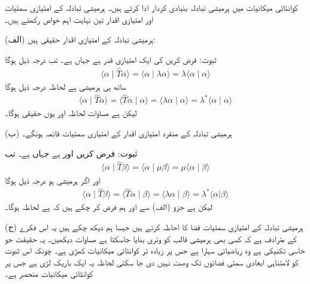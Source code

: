 کوانٹائی میکانیات میں ہرمیشی تبادلہ  بنیادی کردار ادا کرتے ہیں۔ ہرمیشی تبادلہ کے امتیازی سمتیات اور امتیازی اقدار تین نہایت اہم خواص رکھتے ہیں۔

(الف) ہرمیشی تبادلہ کے امتیازی اقدار حقیقی ہیں:

ثبوت: فرض کریں  کی ایک امتیازی قدر  ہے  جہاں  ہے۔ تب درجہ ذیل ہوگا
\begin{align*}
	\langle\alpha\mid\hat{T}\alpha\rangle = \langle\alpha\mid\lambda\alpha\rangle = \lambda\langle\alpha\mid\alpha\rangle
\end{align*}
ساتھ ہی  ہرمیشی ہے لحاظہ درجہ ذیل ہوگا
\begin{align*}
	\langle\alpha\mid\hat{T}\alpha\rangle = \langle\hat{T}\alpha\mid\alpha\rangle = \langle\lambda\alpha\mid\alpha\rangle = \lambda^*\langle\alpha\mid\alpha\rangle
\end{align*}
لیکن  ہے مساوات  لحاظہ  اور یوں  حقیقی ہوگا۔

(ب) ہرمیشی تبادلہ کے منفرد امتیازی اقدار کے امتیازی سمتیات قائمہ ہونگے۔

ثبوت: فرض کریں  اور  ہے جہاں  ہے۔ تب
\begin{align*}
	\langle\alpha\mid\hat{T}\beta\rangle = \langle\alpha\mid\mu\beta\rangle = \mu\langle\alpha\mid\beta\rangle
\end{align*}
اور اگر  ہرمیشی ہو درجہ ذیل ہوگا
\begin{align*}
	\langle\alpha\mid\hat{T}\beta\rangle = \langle\hat{T}\alpha\mid\beta\rangle = \langle\lambda\alpha\mid\beta\rangle = \lambda^*\langle\alpha|\beta\rangle
\end{align*}
لیکن  ہے جزو (الف) سے اور ہم فرض کر چکے ہیں کہ  ہے لحاظہ  ہوگا۔

(ج) ہرمیشی تبادلہ کے امتیازی سمتیات فضا کا احاطہ کرتے ہیں جیسا ہم دیکھ چکے ہیں یہ اس فکرے کے مترادف ہے کہ کسی بھی ہرمیشی قالب کو وتری بنایا جاسکتا ہے مساوات  دیکھیں۔ یہ حقیقت جو خاسی تکنیکی ہے وہ ریاضیاتی سہارا ہے جس پر زیادہ تر کوانٹائی میکانیات کھڑی ہے۔ چونکہ اس ثبوت کو لامتناہی ابعادی سمتی فضائوں تک وصت نہیں دی جا سکتی لحاظہ یہ ایک باریک لڑی ہے جس پر کوانٹائی میکانیات منحصر ہے۔

